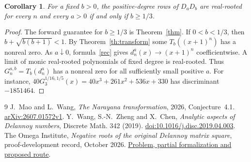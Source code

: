 \documentclass[11pt]{article}
\newtheorem{corollary}[theorem]{Corollary}
\begin{document}
\begin{corollary}
For a fixed $b>0$, the positive-degree rows of $D_aD_b$ are real-rooted for every $n$ and every $a>0$ if and only if $b\ge1/3$.
\end{corollary}
\begin{proof}
The forward guarantee for $b\ge1/3$ is Theorem~\ref{thm}. If $0<b<1/3$, then $b+\sqrt{b(b+1)}<1$. By Theorem~\ref{th:transform} some $T_b((x+1)^n)$ has a nonreal zero. As $a\downarrow0$, formula~\eqref{rec} gives $d_n^a(x)\to(x+1)^n$ coefficientwise. A limit of monic real-rooted polynomials of fixed degree is real-rooted. Thus $G_n^{a,b}=T_b(d_n^a)$ has a nonreal zero for all sufficiently small positive $a$. For instance, $40G_3^{1/16,1/5}(x)=40x^3+261x^2+536x+330$ has discriminant $-1851464$.
\end{proof}

\begin{thebibliography}{9}
 J.~Mao and L.~Wang, \emph{The Narayana transformation}, 2026, Conjecture~4.1. \href{https://arxiv.org/abs/2607.01572v1}{arXiv:2607.01572v1}.
 Y.~Wang, S.-N.~Zheng and X.~Chen, \emph{Analytic aspects of Delannoy numbers}, Discrete Math. 342 (2019). \href{https://doi.org/10.1016/j.disc.2019.04.003}{doi:10.1016/j.disc.2019.04.003}.
 The Omega Institute, \emph{Negative roots of the original Delannoy matrix square}, proof-development record, October 2026. \href{https://the-omega-institute.github.io/trureturing-mdbook/Problems/mao-wang-2026-delannoy-square-negative-roots.html}{Problem, partial formalization and proposed route}.
\end{thebibliography}
\end{document}
